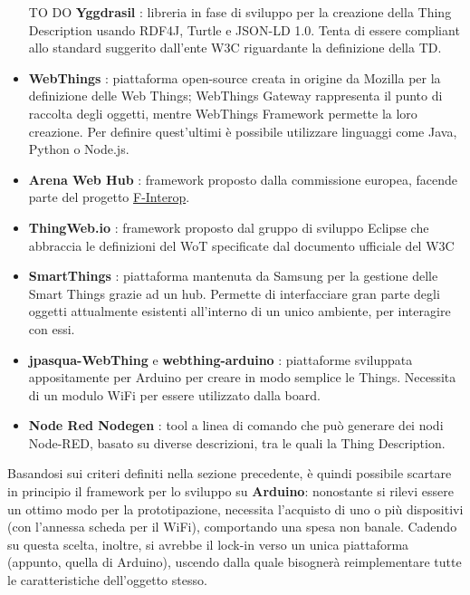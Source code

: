 \documentclass[12pt,a4paper,openright,oneside]{report}
\begin{document}
\begin{itemize}
	\item [TO DO] \textbf{Yggdrasil} \cite{wot-td-java}: libreria in fase di sviluppo per la creazione della Thing Description usando RDF4J, Turtle e JSON-LD 1.0. Tenta di essere compliant allo standard suggerito dall'ente W3C riguardante la definizione della TD.
	
	
	\item \textbf{WebThings} \cite{webthings}: piattaforma open-source creata in origine da Mozilla per la definizione delle Web Things; WebThings Gateway rappresenta il punto di raccolta degli oggetti, mentre WebThings Framework permette la loro creazione. Per definire quest'ultimi è possibile utilizzare linguaggi come Java, Python o Node.js.
	
	\item \textbf{Arena Web Hub} \cite{arenawh}: framework proposto dalla commissione europea, facende parte del progetto \href{https://www.f-interop.eu/}{F-Interop}.
	
	
	\item \textbf{ThingWeb.io} \cite{thingweb}: framework proposto dal gruppo di sviluppo Eclipse che abbraccia le definizioni del WoT specificate dal documento ufficiale del W3C
	
	
	\item \textbf{SmartThings} \cite{smartthings}: piattaforma mantenuta da Samsung per la gestione delle Smart Things grazie ad un hub. Permette di interfacciare gran parte degli oggetti attualmente esistenti all'interno di un unico ambiente, per interagire con essi.
	
	\item \textbf{jpasqua-WebThing} \cite{jpasqua} e \textbf{webthing-arduino} \cite{wtarduino}: piattaforme sviluppata appositamente per Arduino per creare in modo semplice le Things. Necessita di un modulo WiFi per essere utilizzato dalla board.
	
	\item \textbf{Node Red Nodegen} \cite{nodered}: tool a linea di comando che può generare dei nodi Node-RED, basato su diverse descrizioni, tra le quali la Thing Description.
\end{itemize}


Basandosi sui criteri definiti nella sezione precedente, è quindi possibile scartare in principio il framework per lo sviluppo su \textbf{Arduino}: nonostante si rilevi essere un ottimo modo per la prototipazione, necessita l'acquisto di uno o più dispositivi (con l'annessa scheda per il WiFi), comportando una spesa non banale. Cadendo su questa scelta, inoltre, si avrebbe il lock-in verso un unica piattaforma (appunto, quella di Arduino), uscendo dalla quale bisognerà reimplementare tutte le caratteristiche dell'oggetto stesso.\\
\end{document}
